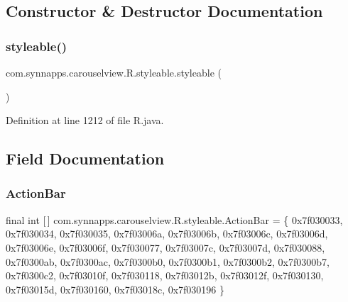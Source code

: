 \subsection{Constructor \& Destructor Documentation}
\mbox{\label{classcom_1_1synnapps_1_1carouselview_1_1_r_1_1styleable_af9f753a3b7718345c84ab1f1e632bab2}} 
\subsubsection{\texorpdfstring{styleable()}{styleable()}}
{\footnotesize\ttfamily com.\+synnapps.\+carouselview.\+R.\+styleable.\+styleable (\begin{DoxyParamCaption}{ }\end{DoxyParamCaption})\hspace{0.3cm}{\ttfamily [private]}}



Definition at line 1212 of file R.\+java.


\begin{DoxyCode}{0}

\end{DoxyCode}


\subsection{Field Documentation}
\mbox{\label{classcom_1_1synnapps_1_1carouselview_1_1_r_1_1styleable_aabf2a70615c0381390e9cfee5b3a8e95}} 
\subsubsection{\texorpdfstring{ActionBar}{ActionBar}}
{\footnotesize\ttfamily final int \mbox{[}$\,$\mbox{]} com.\+synnapps.\+carouselview.\+R.\+styleable.\+Action\+Bar = \{ 0x7f030033, 0x7f030034, 0x7f030035, 0x7f03006a, 0x7f03006b, 0x7f03006c, 0x7f03006d, 0x7f03006e, 0x7f03006f, 0x7f030077, 0x7f03007c, 0x7f03007d, 0x7f030088, 0x7f0300ab, 0x7f0300ac, 0x7f0300b0, 0x7f0300b1, 0x7f0300b2, 0x7f0300b7, 0x7f0300c2, 0x7f03010f, 0x7f030118, 0x7f03012b, 0x7f03012f, 0x7f030130, 0x7f03015d, 0x7f030160, 0x7f03018c, 0x7f030196 \}\hspace{0.3cm}{\ttfamily [static]}}



